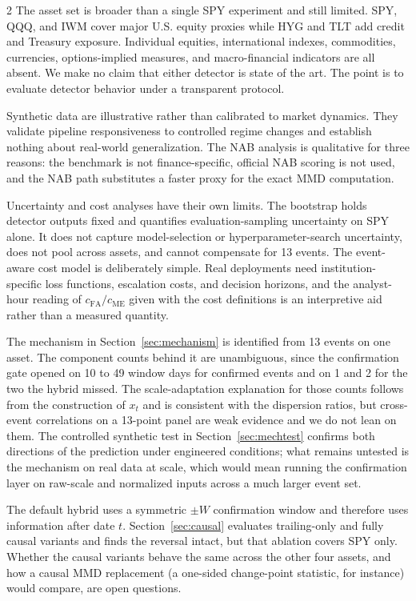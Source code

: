 \documentclass{book}
\begin{document}
\begin{multicols}{2}
The asset set is broader than a single SPY experiment and still limited. SPY, QQQ, and IWM cover major U.S. equity proxies while HYG and TLT add credit and Treasury exposure. Individual equities, international indexes, commodities, currencies, options-implied measures, and macro-financial indicators are all absent. We make no claim that either detector is state of the art. The point is to evaluate detector behavior under a transparent protocol.

Synthetic data are illustrative rather than calibrated to market dynamics. They validate pipeline responsiveness to controlled regime changes and establish nothing about real-world generalization. The NAB analysis is qualitative for three reasons: the benchmark is not finance-specific, official NAB scoring is not used, and the NAB path substitutes a faster proxy for the exact MMD computation.

Uncertainty and cost analyses have their own limits. The bootstrap holds detector outputs fixed and quantifies evaluation-sampling uncertainty on SPY alone. It does not capture model-selection or hyperparameter-search uncertainty, does not pool across assets, and cannot compensate for 13 events. The event-aware cost model is deliberately simple. Real deployments need institution-specific loss functions, escalation costs, and decision horizons, and the analyst-hour reading of $c_{\mathrm{FA}}/c_{\mathrm{ME}}$ given with the cost definitions is an interpretive aid rather than a measured quantity.

The mechanism in Section~\ref{sec:mechanism} is identified from 13 events on one asset. The component counts behind it are unambiguous, since the confirmation gate opened on 10 to 49 window days for confirmed events and on 1 and 2 for the two the hybrid missed. The scale-adaptation explanation for those counts follows from the construction of $x_t$ and is consistent with the dispersion ratios, but cross-event correlations on a 13-point panel are weak evidence and we do not lean on them. The controlled synthetic test in Section~\ref{sec:mechtest} confirms both directions of the prediction under engineered conditions; what remains untested is the mechanism on real data at scale, which would mean running the confirmation layer on raw-scale and normalized inputs across a much larger event set.

The default hybrid uses a symmetric $\pm W$ confirmation window and therefore uses information after date $t$. Section~\ref{sec:causal} evaluates trailing-only and fully causal variants and finds the reversal intact, but that ablation covers SPY only. Whether the causal variants behave the same across the other four assets, and how a causal MMD replacement (a one-sided change-point statistic, for instance) would compare, are open questions.


\end{multicols}
\end{document}
